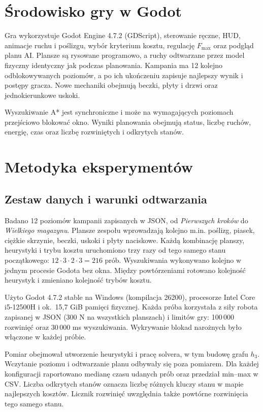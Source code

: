\documentclass[a4paper,11pt]{article}
\begin{document}
\section{Środowisko gry w Godot}
Gra wykorzystuje Godot Engine 4.7.2 (GDScript), sterowanie ręczne, HUD, animacje ruchu i poślizgu, wybór kryterium kosztu, regulację $F_{\max}$ oraz podgląd planu AI. Plansze są rysowane programowo, a ruchy odtwarzane przez model fizyczny identyczny jak podczas planowania. Kampania ma 12 kolejno odblokowywanych poziomów, a po ich ukończeniu zapisuje najlepszy wynik i postępy gracza. Nowe mechaniki obejmują beczki, płyty i drzwi oraz jednokierunkowe uskoki.

Wyszukiwanie A* jest synchroniczne i może na wymagających poziomach przejściowo blokować okno. Wyniki planowania obejmują status, liczbę ruchów, energię, czas oraz liczbę rozwiniętych i odkrytych stanów.

\section{Metodyka eksperymentów}
\subsection{Zestaw danych i warunki odtwarzania}
Badano 12 poziomów kampanii zapisanych w JSON, od \emph{Pierwszych kroków} do \emph{Wielkiego magazynu}. Plansze zespołu wprowadzają kolejno m.in. poślizg, piasek, ciężkie skrzynie, beczki, uskoki i płyty naciskowe. Każdą kombinację planszy, heurystyki i trybu kosztu uruchomiono trzy razy od tego samego stanu początkowego: $12\cdot3\cdot2\cdot3=216$ prób. Wyszukiwania wykonywano kolejno w jednym procesie Godota bez okna. Między powtórzeniami rotowano kolejność heurystyk i zmieniano kolejność trybów kosztu.

Użyto Godot 4.7.2 stable na Windows (kompilacja 26200), procesorze Intel Core i5-12500H i ok.\ 15,7 GiB pamięci fizycznej. Każda próba korzystała z siły robota zapisanej w JSON (300 N na wszystkich planszach) i limitów gry: 100\,000 rozwinięć oraz 30\,000 ms wyszukiwania. Wykrywanie blokad narożnych było włączone w każdej próbie.

Pomiar obejmował utworzenie heurystyki i pracę solvera, w tym budowę grafu $h_3$. Wczytanie poziomu i odtwarzanie planu odbywały się poza pomiarem. Dla każdej konfiguracji raportowano medianę czasu udanych prób oraz przedział min--max w CSV. Liczba odkrytych stanów oznacza liczbę różnych kluczy stanu w mapie najlepszych kosztów. Licznik rozwinięć uwzględnia także powtórne rozwinięcia tego samego stanu.
\end{document}
